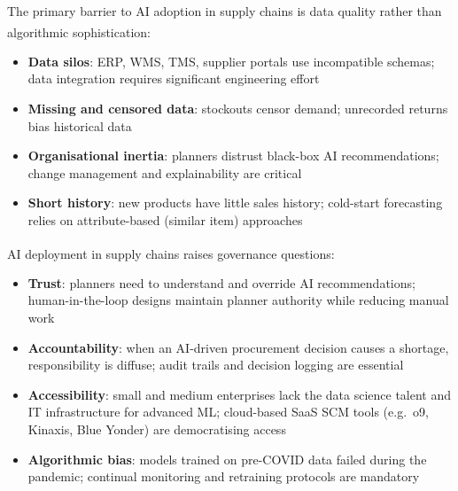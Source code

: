 \begin{tcbitemize}[ skin=sectionraster ]

    \tcbitem[title=Data Quality and Organisational Challenges, raster multicolumn=3]
    The primary barrier to AI adoption in supply chains is data quality rather than algorithmic sophistication\textsuperscript{\cite[][pp.~620--625]{chopraSupplyChainManagement2019}}:
    \begin{itemize}
        \item \textbf{Data silos}: ERP, WMS, TMS, supplier portals use incompatible schemas; data integration requires significant engineering effort
        \item \textbf{Missing and censored data}: stockouts censor demand; unrecorded returns bias historical data
        \item \textbf{Organisational inertia}: planners distrust black-box AI recommendations; change management and explainability are critical
        \item \textbf{Short history}: new products have little sales history; cold-start forecasting relies on attribute-based (similar item) approaches
    \end{itemize}

    \tcbitem[title={Trust, Accountability, and Accessibility}, raster multicolumn=3]
    AI deployment in supply chains raises governance questions\textsuperscript{\cite[][pp.~625--630]{chopraSupplyChainManagement2019}}:
    \begin{itemize}
        \item \textbf{Trust}: planners need to understand and override AI recommendations; human-in-the-loop designs maintain planner authority while reducing manual work
        \item \textbf{Accountability}: when an AI-driven procurement decision causes a shortage, responsibility is diffuse; audit trails and decision logging are essential
        \item \textbf{Accessibility}: small and medium enterprises lack the data science talent and IT infrastructure for advanced ML; cloud-based SaaS SCM tools (e.g.\ o9, Kinaxis, Blue Yonder) are democratising access
        \item \textbf{Algorithmic bias}: models trained on pre-COVID data failed during the pandemic; continual monitoring and retraining protocols are mandatory
    \end{itemize}

\end{tcbitemize}

